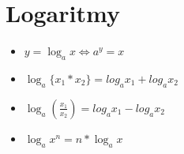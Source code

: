 \documentclass{article}
\begin{document}
	\section*{Logaritmy}
	\begin{multicols}{2}
		\begin{itemize}
			\item $y=\log_a{x} \Leftrightarrow a^y = x$
			\item $\log_a{\{x_1*x_2\}}=log_a{x_1} + log_a{x_2}$
		\columnbreak
			\item $\log_a{\left(\frac{x_1}{x_2}\right)}=log_a{x_1} - log_a{x_2}$
			\item $\log_a{x^n}=n*\log_a{x}$
		\end{itemize}
	\end{multicols}
\end{document}
